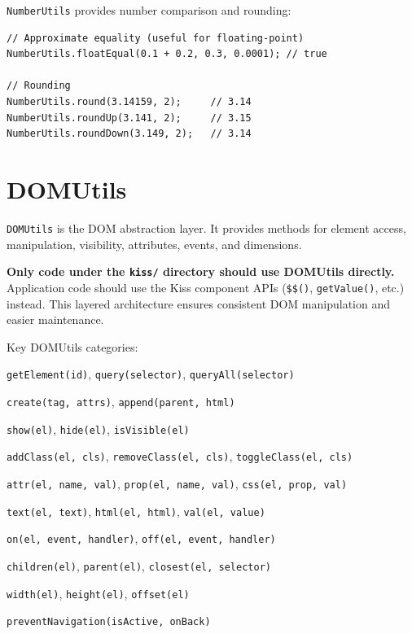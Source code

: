 \texttt{NumberUtils} provides number comparison and rounding:

\begin{lstlisting}[style=javascript]
// Approximate equality (useful for floating-point)
NumberUtils.floatEqual(0.1 + 0.2, 0.3, 0.0001); // true

// Rounding
NumberUtils.round(3.14159, 2);     // 3.14
NumberUtils.roundUp(3.141, 2);     // 3.15
NumberUtils.roundDown(3.149, 2);   // 3.14
\end{lstlisting}

\section{DOMUtils}
\label{sec:feu-domutils}

\texttt{DOMUtils} is the DOM abstraction layer.  It provides methods for element access, manipulation, visibility, attributes, events, and dimensions.

\begin{warnbox}
\textbf{Only code under the \texttt{kiss/} directory should use DOMUtils directly.}  Application code should use the Kiss component APIs (\texttt{\$\$()}, \texttt{getValue()}, etc.) instead.  This layered architecture ensures consistent DOM manipulation and easier maintenance.
\end{warnbox}

\noindent
Key DOMUtils categories:

\begin{description}[style=nextline]
  \item[Element access] \texttt{getElement(id)}, \texttt{query(selector)}, \texttt{queryAll(selector)}
  \item[Creation] \texttt{create(tag, attrs)}, \texttt{append(parent, html)}
  \item[Visibility] \texttt{show(el)}, \texttt{hide(el)}, \texttt{isVisible(el)}
  \item[Classes] \texttt{addClass(el, cls)}, \texttt{removeClass(el, cls)}, \texttt{toggleClass(el, cls)}
  \item[Attributes] \texttt{attr(el, name, val)}, \texttt{prop(el, name, val)}, \texttt{css(el, prop, val)}
  \item[Content] \texttt{text(el, text)}, \texttt{html(el, html)}, \texttt{val(el, value)}
  \item[Events] \texttt{on(el, event, handler)}, \texttt{off(el, event, handler)}
  \item[Navigation] \texttt{children(el)}, \texttt{parent(el)}, \texttt{closest(el, selector)}
  \item[Dimensions] \texttt{width(el)}, \texttt{height(el)}, \texttt{offset(el)}
  \item[Navigation protection] \texttt{preventNavigation(isActive, onBack)}
\end{description}


